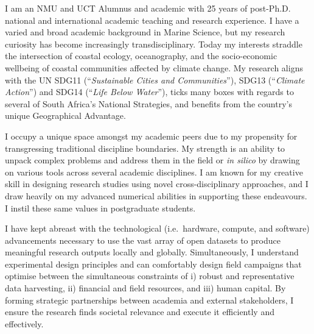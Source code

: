 \documentclass[9.5pt, a4paper]{awesome-cv-mod} %
\begin{document}
\makecvheader %

\makelettertitle %


\begin{cvletter}



I am an NMU and UCT Alumnus and academic with 25 years of post-Ph.D. national and international academic teaching and research experience. I have a varied and broad academic background in Marine Science, but my research curiosity has become increasingly transdisciplinary. Today my interests straddle the intersection of coastal ecology, oceanography, and the socio-economic wellbeing of coastal communities affected by climate change. My research aligns with the UN SDG11 (“\emph{Sustainable Cities and Communities}”), SDG13 (“\emph{Climate Action}”) and SDG14 (“\emph{Life Below Water}”), ticks many boxes with regards to several of South Africa’s National Strategies, and benefits from the country’s unique Geographical Advantage.



I occupy a unique space amongst my academic peers due to my propensity for transgressing traditional discipline boundaries. My strength is an ability to unpack complex problems and address them in the field or \emph{in silico} by drawing on various tools across several academic disciplines. I am known for my creative skill in designing research studies using novel cross-disciplinary approaches, and I draw heavily on my advanced numerical abilities in supporting these endeavours. I instil these same values in postgraduate students.

I have kept abreast with the technological (i.e.~hardware, compute, and software) advancements necessary to use the vast array of open datasets to produce meaningful research outputs locally and globally. Simultaneously, I understand experimental design principles and can comfortably design field campaigns that optimise between the simultaneous constraints of i) robust and representative data harvesting, ii) financial and field resources, and iii) human capital. By forming strategic partnerships between academia and external stakeholders, I ensure the research finds societal relevance and execute it efficiently and effectively.


\end{cvletter}
\end{document}
